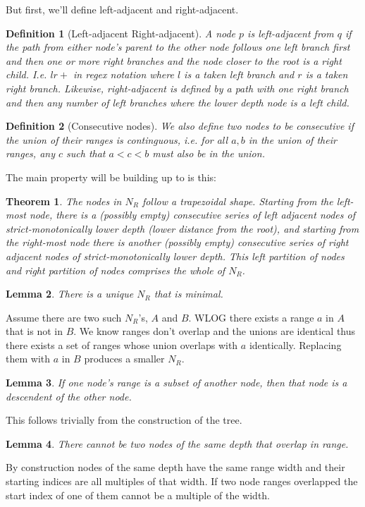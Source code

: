 \documentclass{article}
\newtheorem{definition}{Definition}[section]
\newtheorem{theorem}{Theorem}[section]
\newtheorem{lemma}[theorem]{Lemma}
\begin{document}
But first, we'll define left-adjacent and right-adjacent.
\begin{definition}[Left-adjacent Right-adjacent]
A node $p$ is
left-adjacent from $q$ if the path from either node's parent to the other node follows one left
branch first and then one or more right branches and the node closer to the root
is a right child. I.e. $lr+$ in regex notation
where $l$ is a taken left branch and $r$ is a taken right branch. Likewise, right-adjacent is
defined by a path with one right branch and then any number of left
branches where the lower depth node is a left child.
\end{definition}

\begin{definition}[Consecutive nodes]
We also define two nodes to be consecutive if the union of their ranges is
continguous, i.e. for all $a, b$ in the union of their ranges, any $c$ such that
$a < c < b$ must also be in the union.
\end{definition}

The main property will be building up to is this:

\begin{theorem}
  The nodes in $N_R$ follow a trapezoidal shape. Starting from the left-most
  node, there is a (possibly empty) consecutive series of left adjacent nodes of
  strict-monotonically lower depth
  (lower distance from the root), and starting from the right-most node there is
  another (possibly empty) consecutive series of right adjacent nodes of
  strict-monotonically lower depth. This left partition of nodes and right
  partition of nodes comprises the whole of $N_R$.
\end{theorem}

\begin{lemma}
  There is a unique $N_R$ that is minimal.
\end{lemma}
Assume there are two such $N_R$'s, $A$ and $B$. WLOG there exists a range $a$ in
$A$ that is not in $B$. We know ranges don't overlap and the unions are
identical thus there exists a set of ranges whose union overlaps with $a$
identically. Replacing them with $a$ in $B$ produces a smaller $N_R$.

\begin{lemma}
  If one node's range is a subset of another node, then that node is a
  descendent of the other node.
\end{lemma}
This follows trivially from the construction of the tree.

\begin{lemma}
  There cannot be two nodes of the same depth that overlap in range.
\end{lemma}
By construction nodes of the same depth have the same range width and their
starting indices are all multiples of that width. If two node ranges overlapped
the start index of one of them cannot be a multiple of the width.
\end{document}

